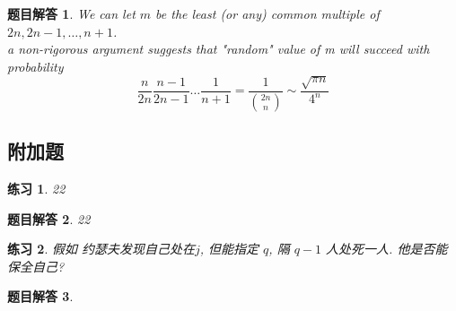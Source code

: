 \documentclass[mode=geye]{elegantnote}
\newtheorem{exercise}{练习}
\newtheorem{answer}{题目解答}
\begin{document}
\begin{answer}
	We can let $ m $ be the least (or any) common multiple of $ 2n, 2n-1, \dots, n+1 $.\\
	a non-rigorous argument suggests that "random" value of m will succeed with probability 
	\begin{equation*}
		\frac{n}{2n} \frac{n-1}{2n-1} \dots \frac{1}{n+1} = \frac{1}{\binom{2n}{n}} \sim \frac{\sqrt{\pi n}}{4^n}
	\end{equation*}
\end{answer}

\subsection{附加题}
\begin{exercise}
	22
\end{exercise}

\begin{answer}
	22
\end{answer}

\begin{exercise}
	假如 约瑟夫发现自己处在$ j $, 但能指定 $ q $,  隔 $ q-1 $  人处死一人. 他是否能保全自己?
\end{exercise}

\begin{answer}
	
\end{answer}
\end{document}
